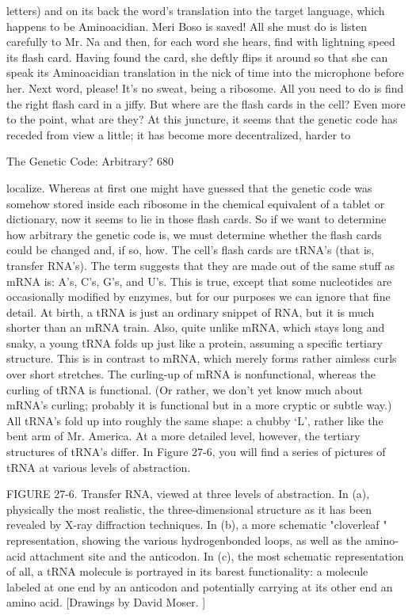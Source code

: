 letters) and on its back the word's translation into the target language, which happens
to be Aminoacidian. Meri Boso is saved! All she must do is listen carefully to Mr. Na
and then, for each word she hears, find with lightning speed its flash card. Having
found the card, she deftly flips it around so that she can speak its Aminoacidian
translation in the nick of time into the microphone before her. Next word, please!
         It's no sweat, being a ribosome. All you need to do is find the right flash card
in a jiffy. But where are the flash cards in the cell? Even more to the point, what are
they? At this juncture, it seems that the genetic code has receded from view a little; it
has become more decentralized, harder to




The Genetic Code: Arbitrary?                                                         680

localize. Whereas at first one might have guessed that the genetic code was somehow
stored inside each ribosome in the chemical equivalent of a tablet or dictionary, now it
seems to lie in those flash cards. So if we want to determine how arbitrary the genetic
code is, we must determine whether the flash cards could be changed and, if so, how.
        The cell's flash cards are tRNA's (that is, transfer RNA's). The term suggests
that they are made out of the same stuff as mRNA is: A's, C's, G's, and U's. This is
true, except that some nucleotides are occasionally modified by enzymes, but for our
purposes we can ignore that fine detail. At birth, a tRNA is just an ordinary snippet of
RNA, but it is much shorter than an mRNA train. Also, quite unlike mRNA, which
stays long and snaky, a young tRNA folds up just like a protein, assuming a specific
tertiary structure. This is in contrast to mRNA, which merely forms rather aimless
curls over short stretches. The curling-up of mRNA is nonfunctional, whereas the
curling of tRNA is functional. (Or rather, we don't yet know much about mRNA's
curling; probably it is functional but in a more cryptic or subtle way.) All tRNA's fold
up into roughly the same shape: a chubby `L', rather like the bent arm of Mr. America.
At a more detailed level, however, the tertiary structures of tRNA's differ. In Figure
27-6, you will find a series of pictures of tRNA at various levels of abstraction.


        FIGURE 27-6. Transfer RNA, viewed at three levels of abstraction. In (a),
physically the most realistic, the three-dimensional structure as it has been revealed
by X-ray diffraction techniques. In (b), a more schematic "cloverleaf " representation,
showing the various hydrogenbonded loops, as well as the amino-acid attachment site
and the anticodon. In (c), the most schematic representation of all, a tRNA molecule
is portrayed in its barest functionality: a molecule labeled at one end by an anticodon
and potentially carrying at its other end an amino acid. [Drawings by David Moser. ]




